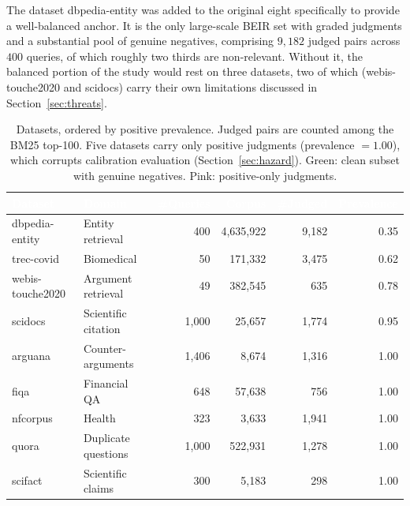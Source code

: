 \documentclass[sn-mathphys-num,pdflatex]{sn-jnl}
\newcommand{\thead}[1]{\textcolor{white}{\textbf{#1}}}
\begin{document}
The dataset dbpedia-entity was added to the original eight specifically to provide
a well-balanced anchor. It is the only large-scale BEIR set with graded judgments
and a substantial pool of genuine negatives, comprising $9{,}182$ judged pairs
across $400$ queries, of which roughly two thirds are non-relevant. Without it,
the balanced portion of the study would rest on three datasets, two of which
(webis-touche2020 and scidocs) carry their own limitations discussed in
Section~\ref{sec:threats}.

\begin{table}[t]
\centering
\caption{Datasets, ordered by positive prevalence. Judged pairs are counted among
the BM25 top-100. Five datasets carry only positive judgments
(prevalence $=1.00$), which corrupts calibration evaluation
(Section~\ref{sec:hazard}).
\textcolor{green!50!black}{Green}: clean subset with genuine negatives.
\textcolor{red!50!black}{Pink}: positive-only judgments.}\label{tab:datasets}
\small
\begin{tabular}{llrrrr}
\toprule
\rowcolor{headblue}
\thead{Dataset} & \thead{Domain} & \thead{\#Queries} & \thead{Corpus} & \thead{\#Judged} & \thead{Prevalence} \\
\midrule
\rowcolor{cleangreen}
dbpedia-entity   & Entity retrieval     & 400   & 4{,}635{,}922 & 9{,}182 & 0.35 \\
\rowcolor{cleangreen}
trec-covid       & Biomedical           & 50    & 171{,}332     & 3{,}475 & 0.62 \\
\rowcolor{cleangreen}
webis-touche2020 & Argument retrieval   & 49    & 382{,}545     & 635     & 0.78 \\
\rowcolor{cleangreen}
scidocs          & Scientific citation  & 1{,}000 & 25{,}657    & 1{,}774 & 0.95 \\
\rowcolor{singleclasspink}
arguana          & Counter-arguments    & 1{,}406 & 8{,}674     & 1{,}316 & 1.00 \\
\rowcolor{singleclasspink}
fiqa             & Financial QA         & 648   & 57{,}638      & 756     & 1.00 \\
\rowcolor{singleclasspink}
nfcorpus         & Health               & 323   & 3{,}633       & 1{,}941 & 1.00 \\
\rowcolor{singleclasspink}
quora            & Duplicate questions  & 1{,}000 & 522{,}931   & 1{,}278 & 1.00 \\
\rowcolor{singleclasspink}
scifact          & Scientific claims    & 300   & 5{,}183       & 298     & 1.00 \\
\bottomrule
\end{tabular}
\end{table}
\end{document}
